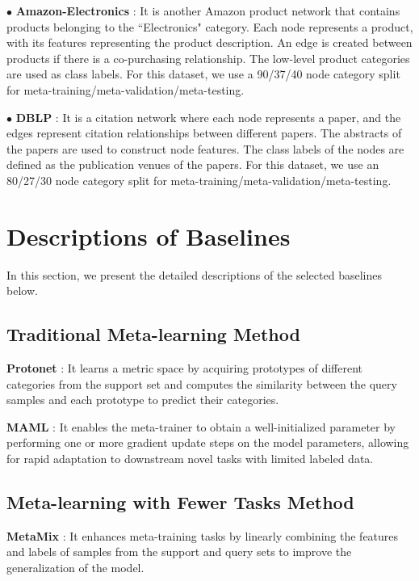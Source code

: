 \noindent $\bullet$ \textbf{Amazon-Electronics} \cite{mcauley2015inferring}: It is another Amazon product network that contains products belonging to the ``Electronics" category. Each node represents a product, with its features representing the product description. An edge is created between products if there is a co-purchasing relationship. The low-level product categories are used as class labels. For this dataset, we use a 90/37/40 node category split for meta-training/meta-validation/meta-testing.

\noindent $\bullet$ \textbf{DBLP} \cite{tang2008arnetminer}: It is a citation network where each node represents a paper, and the edges represent citation relationships between different papers. The abstracts of the papers are used to construct node features. The class labels of the nodes are defined as the publication venues of the papers. For this dataset, we use an 80/27/30 node category split for meta-training/meta-validation/meta-testing.


\section{Descriptions of Baselines}
\label{baseline}
In this section, we present the detailed descriptions of the selected baselines below.

\subsection{Traditional Meta-learning Method}
\noindent \textbf{Protonet} \cite{snell2017prototypical}: It learns a metric space by acquiring prototypes of different categories from the support set and computes the similarity between the query samples and each prototype to predict their categories.

\noindent \textbf{MAML} \cite{finn2017model}: It enables the meta-trainer to obtain a well-initialized parameter by performing one or more gradient update steps on the model parameters, allowing for rapid adaptation to downstream novel tasks with limited labeled data.

\subsection{Meta-learning with Fewer Tasks Method}
\noindent \textbf{MetaMix} \cite{yao2021improving}: It enhances meta-training tasks by linearly combining the features and labels of samples from the support and query sets to improve the generalization of the model.

